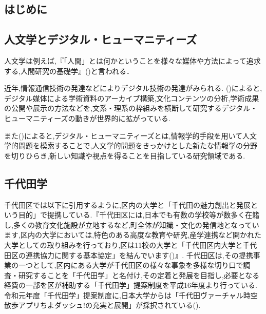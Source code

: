 \documentclass[a4paper, twoside]{jarticle}
\begin{document}
\maketitle %
\begin{multicols}{2} %
\setcounter{page}{1} %

\section{はじめに}

\subsection{人文学とデジタル・ヒューマニティーズ}
人文学は例えば,『「人間」とは何かということを様々な媒体や方法によって追求する,人間研究の基礎学』(\cite{huma})と言われる．\par
近年,情報通信技術の発達などによりデジタル技術の発達がみられる.
(\cite{digihumu1})によると,デジタル媒体による学術資料のアーカイブ構築,文化コンテンツの分析,学術成果の公開や展示の方法などを,文系・理系の枠組みを横断して研究するデジタル・ヒューマニティーズの動きが世界的に拡がっている.\par

また(\cite{digihumu2})によると,デジタル・ヒューマニティーズとは,情報学的手段を用いて人文学的問題を模索することで,人文学的問題をきっかけとした新たな情報学の分野を切りひらき,新しい知識や視点を得ることを目指している研究領域である.

\subsection{千代田学}
千代田区では以下に引用するように,区内の大学と「千代田の魅力創出と発展という目的」で提携している.『千代田区には,日本でも有数の学校等が数多く在籍し,多くの教育文化施設が立地するなど,町全体が知識・文化の発信地となっています,区内の大学においては,特色のある高度な教育や研究,産学連携など開かれた大学としての取り組みを行っており,区は11校の大学と「千代田区内大学と千代田区の連携協力に関する基本協定」を結んでいます(\cite{digi4})』.
千代田区は,その提携事業の一つとして,区内にある大学が千代田区の様々な事象を多様な切り口で調査・研究することを「千代田学」と名付け,その定着と発展を目指し,必要となる経費の一部を区が補助する「千代田学」提案制度を平成16年度より行っている.令和元年度「千代田学」提案制度に,日本大学からは「千代田ヴァーチャル時空散歩アプリちよダッシュ!の充実と展開」が採択されている(\cite{digi5}).


\end{multicols}
\end{document}
